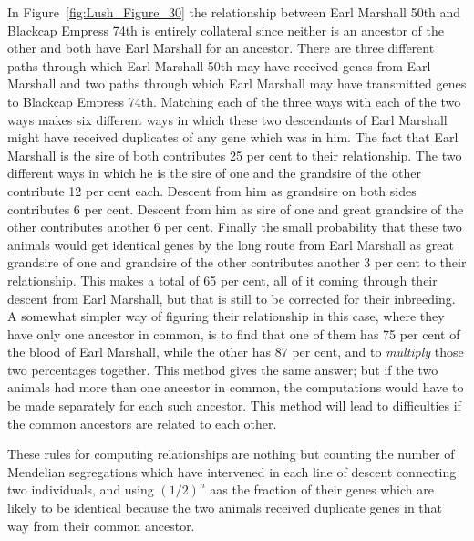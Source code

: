 In Figure~\ref{fig:Lush_Figure_30} the relationship between Earl Marshall 50th and Blackcap
Empress 74th is entirely collateral since neither is an ancestor of the
other and both have Earl Marshall for an ancestor. There are three different
paths through which Earl Marshall 50th may have received genes
from Earl Marshall and two paths through which Earl Marshall may
have transmitted genes to Blackcap Empress 74th. Matching each of the
three ways with each of the two ways makes six different ways in which
these two descendants of Earl Marshall might have received duplicates
of any gene which was in him. The fact that Earl Marshall is the
sire of both contributes 25 per cent to their relationship. The two different
ways in which he is the sire of one and the grandsire of the other
contribute 12 per cent each. Descent from him as grandsire on both
sides contributes 6 per cent. Descent from him as sire of one and great
grandsire of the other contributes another 6 per cent. Finally the
small probability that these two animals would get identical genes by
the long route from Earl Marshall as great grandsire of one and grandsire
of the other contributes another 3  per cent to their relationship.
This makes a total of 65 per cent, all of it coming through their descent
from Earl Marshall, but that is still to be corrected for their
inbreeding. A somewhat simpler way of figuring their relationship in
this case, where they have only one ancestor in common, is to find that
one of them has 75 per cent of the blood of Earl Marshall, while the
other has 87 per cent, and to \textit{multiply} those two percentages together.
This method gives the same answer; but if the two animals had more
than one ancestor in common, the computations would have to be made
separately for each such ancestor. This method will lead to difficulties
if the common ancestors are related to each other.

These rules for computing relationships are nothing but counting
the number of Mendelian segregations which have intervened in each
line of descent connecting two individuals, and using $(1/2)^n$ aas the fraction
of their genes which are likely to be identical because the two animals
received duplicate genes in that way from their common ancestor.

